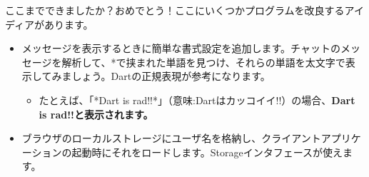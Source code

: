 
ここまでできましたか？おめでとう！ここにいくつかプログラムを改良するアイディアがあります。

\begin{itemize}
\item メッセージを表示するときに簡単な書式設定を追加します。チャットのメッセージを解析して、*で挟まれた単語を見つけ、それらの単語を太文字で表示してみましょう。Dartの正規表現が参考になります。
\begin{itemize}
\item たとえば、「*Dart is rad!!*」（意味:Dartはカッコイイ!!）の場合、\bfseries{Dart is rad!!}と表示されます。
\end{itemize}
\item ブラウザのローカルストレージにユーザ名を格納し、クライアントアプリケーションの起動時にそれをロードします。Storageインタフェースが使えます。
\end{itemize}

\clearpage

